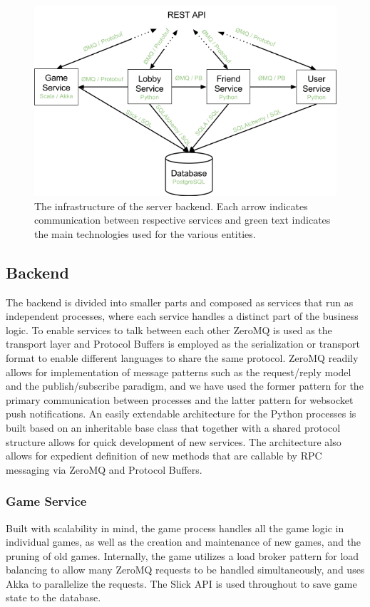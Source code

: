 \begin{figure}[H]
	\centering
	\includegraphics[width=\textwidth,height=\textheight,keepaspectratio=true]{img/sPVjzeXSLniaBJWqfNTsV4A.png}
	\caption{The infrastructure of the server backend. Each arrow indicates communication between respective services and green text indicates the main technologies used for the various entities.}
	\label{fig:sysarch}
\end{figure}

\subsection{Backend}
The backend is divided into smaller parts and composed as services that run as independent processes, where each service handles a distinct part of the business logic. To enable services to talk between each other ZeroMQ is used as the transport layer and Protocol Buffers is employed as the serialization or transport format to enable different languages to share the same protocol. ZeroMQ readily allows for implementation of message patterns such as the request/reply model and the publish/subscribe paradigm, and we have used the former pattern for the primary communication between processes and the latter pattern for websocket push notifications.
An easily extendable architecture for the Python processes is built based on an inheritable base class that together with a shared protocol structure allows for quick development of new services. The architecture also allows for expedient definition of new methods that are callable by RPC messaging via ZeroMQ and Protocol Buffers. 

\subsubsection{Game Service}
Built with scalability in mind, the game process handles all the game logic in individual games, as well as the creation and maintenance of new games, and the pruning of old games. Internally, the game utilizes a load broker pattern for load balancing to allow many ZeroMQ requests to be handled simultaneously, and uses Akka to parallelize the requests. The Slick API is used throughout to save game state to the database.

